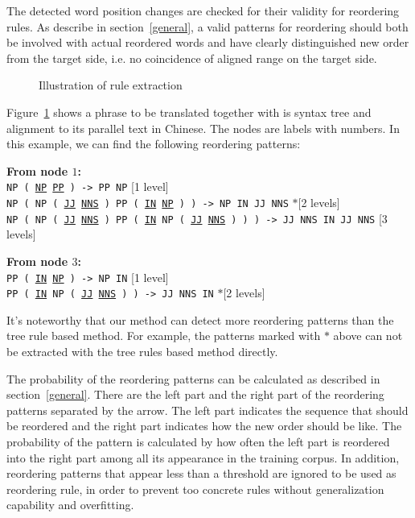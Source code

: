 The detected word position changes are checked for their validity for reordering rules. As describe in section~\ref{general}, a valid patterns for reordering should both be involved with actual reordered words and have clearly distinguished new order from the target side, i.e. no coincidence of aligned range on the target side.

\begin{figure}[H]
\centering

\caption{Illustration of rule extraction}
\label{extract}
\end{figure}

Figure~\ref{extract} shows a phrase to be translated together with is syntax tree and alignment to its parallel text in Chinese. The nodes are labels with numbers. In this example, we can find the following reordering patterns:

\textbf{From node $1$:}\\
\texttt{NP ( \ul{NP} \ul{PP} ) -> PP NP} \hfill [1 level]\\
\texttt{NP ( NP ( \ul{JJ} \ul{NNS} ) PP ( \ul{IN} \ul{NP} ) ) -> NP IN JJ NNS} \hfill $*$[2 levels]\\
\texttt{NP ( NP ( \ul{JJ} \ul{NNS} ) PP ( \ul{IN} NP ( \ul{JJ} \ul{NNS} ) ) ) -> JJ NNS IN JJ NNS} \hfill [3 levels]

\textbf{From node $3$:}\\
\texttt{PP ( \ul{IN} \ul{NP} ) -> NP IN} \hfill [1 level]\\
\texttt{PP ( \ul{IN} NP ( \ul{JJ} \ul{NNS} ) ) -> JJ NNS IN} \hfill $*$[2 levels]

It's noteworthy that our method can detect more reordering patterns than the tree rule based method. For example, the patterns marked with $*$ above can not be extracted with the tree rules based method directly.

The probability of the reordering patterns can be calculated as described in section~\ref{general}. There are the left part and the right part of the reordering patterns separated by the arrow. The left part indicates the sequence that should be reordered and the right part indicates how the new order should be like. The probability of the pattern is calculated by how often the left part is reordered into the right part among all its appearance in the training corpus. In addition, reordering patterns that appear less than a threshold are ignored to be used as reordering rule, in order to prevent too concrete rules without generalization capability and overfitting.

